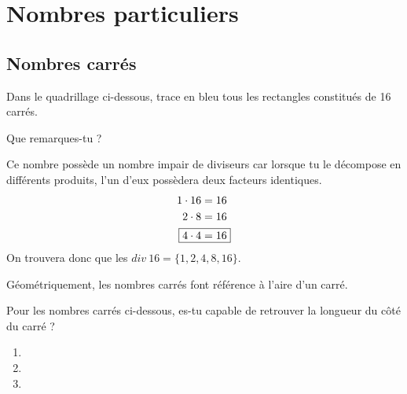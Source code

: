 \documentclass[../../syllabus_1.tex]{subfiles}
\begin{document}
\newpage
\section{Nombres particuliers}

\subsection{Nombres carrés}
Dans le quadrillage ci-dessous, trace en bleu tous les rectangles constitués de 16 carrés.
\begin{center}
\end{center}
Que remarques-tu ? 

Ce nombre possède un nombre impair de diviseurs car lorsque tu le décompose en différents produits,
l'un d'eux possèdera deux facteurs identiques.
\begin{align*}
      1 \cdot 16        & = 16  \\
      2 \cdot 8         & = 16  \\
      \Aboxed{4 \cdot 4 & = 16}
\end{align*}
On trouvera donc que les $div~16=\big\lbrace 1,2,4,8,16 \big\rbrace$.

Géométriquement, les nombres carrés font référence à l'aire d'un carré.

\begin{exercise}
      Pour les nombres carrés ci-dessous, es-tu capable de retrouver la longueur du côté du carré ?
      \begin{enumerate}[cols=3]
            \item
            \item
            \item
      \end{enumerate}
\end{exercise}
\end{document}
